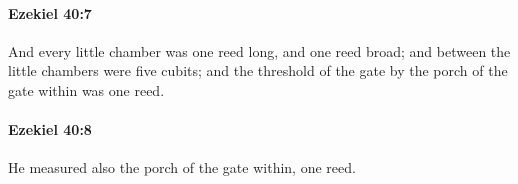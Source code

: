 		\paragraph{Ezekiel 40:7} %
			\label{EZEKIEL-40-7}

			And every little chamber was one reed long, and one reed broad; and between the little chambers were five cubits; and the threshold of the gate by the porch of the gate within was one reed.


		\paragraph{Ezekiel 40:8} %
			\label{EZEKIEL-40-8}

			He measured also the porch of the gate within, one reed.


